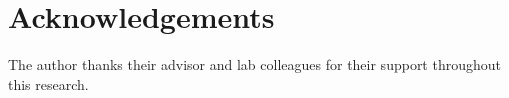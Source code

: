 \chapter*{Acknowledgements}

The author thanks their advisor and lab colleagues for their support
throughout this research.
